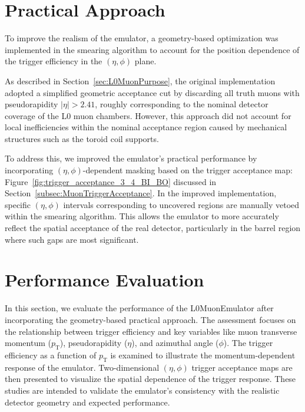 \section{Practical Approach} \label{sec:RealismApproach}
To improve the realism of the emulator, a geometry-based optimization was implemented in the smearing algorithm to account for the position dependence of the trigger efficiency in the $(\eta, \phi)$ plane.

As described in Section~\ref{sec:L0MuonPurpose}, the original implementation adopted a simplified geometric acceptance cut by discarding all truth muons with pseudorapidity $|\eta| > 2.41$, roughly corresponding to the nominal detector coverage of the L0 muon chambers. However, this approach did not account for local inefficiencies within the nominal acceptance region caused by mechanical structures such as the toroid coil supports.

To address this, we improved the emulator's practical performance by incorporating $(\eta, \phi)$-dependent masking based on the trigger acceptance map: Figure~\ref{fig:trigger_acceptance_3_4_BI_BO} discussed in Section~\ref{subsec:MuonTriggerAcceptance}. In the improved implementation, specific $(\eta, \phi)$ intervals corresponding to uncovered regions are manually vetoed within the smearing algorithm. This allows the emulator to more accurately reflect the spatial acceptance of the real detector, particularly in the barrel region where such gaps are most significant.


\section{Performance Evaluation} \label{sec:L0MuonEmulatorPerformance}
In this section, we evaluate the performance of the L0MuonEmulator after incorporating the geometry-based practical approach. The assessment focuses on the relationship between trigger efficiency and key variables like muon transverse momentum ($p_\mathrm{T}$), pseudorapidity ($\eta$), and azimuthal angle ($\phi$). The trigger efficiency as a function of $p_\mathrm{T}$ is examined to illustrate the momentum-dependent response of the emulator. Two-dimensional $(\eta, \phi)$ trigger acceptance maps are then presented to visualize the spatial dependence of the trigger response. These studies are intended to validate the emulator's consistency with the
realistic detector geometry and expected performance.

